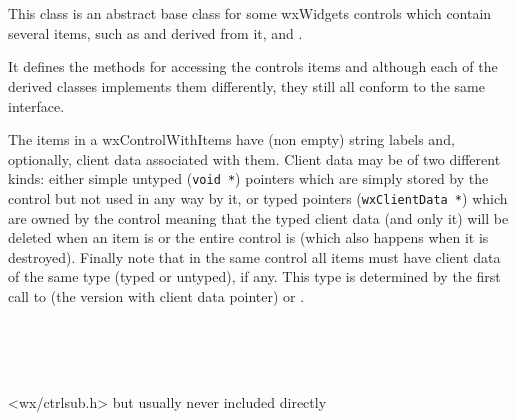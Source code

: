
\section{}\label{wxcontrolwithitems}

This class is an abstract base class for some wxWidgets controls which contain
several items, such as  and
 derived from it,
 and .

It defines the methods for accessing the controls items and although each of
the derived classes implements them differently, they still all conform to the
same interface.

The items in a wxControlWithItems have (non empty) string labels and,
optionally, client data associated with them. Client data may be of two
different kinds: either simple untyped ({\tt void *}) pointers which are simply
stored by the control but not used in any way by it, or typed pointers
({\tt wxClientData *}) which are owned by the control meaning that the typed
client data (and only it) will be deleted when an item is
 or the entire control is
 (which also happens when it is
destroyed). Finally note that in the same control all items must have client
data of the same type (typed or untyped), if any. This type is determined by
the first call to  (the version with
client data pointer) or .


\\
\\
\\


<wx/ctrlsub.h> but usually never included directly


